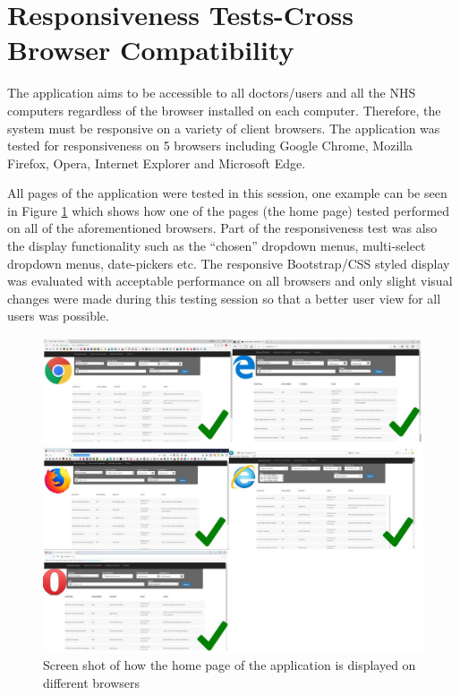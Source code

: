 \section{Responsiveness Tests-Cross Browser Compatibility}
\label{responsiveness_tests}

The application aims to be accessible to all doctors/users and all the NHS computers regardless of the browser installed on each computer. Therefore, the system must be responsive on a variety of client browsers. The application was tested for responsiveness on 5 browsers including Google Chrome, Mozilla Firefox, Opera, Internet Explorer and Microsoft Edge.

All pages of the application were tested in this session, one example can be seen in Figure \ref{responsiveness_test} which shows how one of the pages (the home page) tested performed on all of the aforementioned browsers. Part of the responsiveness test was also the display functionality such as the 	``chosen'' dropdown menus, multi-select dropdown menus, date-pickers etc. The responsive Bootstrap/CSS styled display was evaluated with acceptable performance on all browsers and only slight visual changes were made during this testing session so that a better user view for all users was possible.


\begin{figure}[!ht]
\begin{center}
\includegraphics[width=17cm]{imgs/responsiveness_test.jpg}
\end{center}\vspace{-0.3cm}
\caption[Responsiveness Tests]{Screen shot of how the home page of the application is displayed on different browsers} \label{responsiveness_test}
\end{figure}


